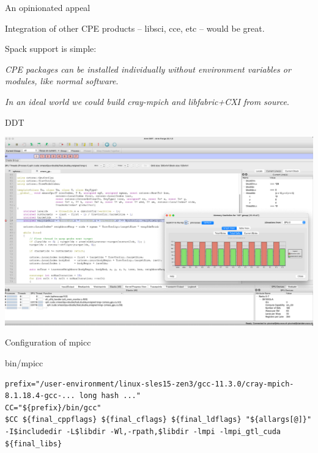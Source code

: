\documentclass[aspectratio=43]{beamer}
\begin{document}

\begin{frame}[fragile]{An opinionated appeal}
    \begin{center}
    Integration of other CPE products -- libsci, cce, etc -- would be great.

    \vspace{20pt}

    Spack support is simple:

    \vspace{20pt}

    \emph{CPE packages can be installed individually without environment variables or modules, like normal software}.

    \vspace{20pt}

    \emph{In an ideal world we could build cray-mpich and libfabric+CXI from source}.
    \end{center}
\end{frame}



\begin{frame}[fragile]{DDT}
    \begin{center}
        \includegraphics[width=\textwidth]{images/sph-ddt-uenv.png}
    \end{center}
\end{frame}

\begin{frame}[fragile]{Configuration of mpicc}
\begin{code}{bin/mpicc}
    \begin{lstlisting}[style=talkbash]
prefix="/user-environment/linux-sles15-zen3/gcc-11.3.0/cray-mpich-8.1.18.4-gcc-... long hash ..."
CC="${prefix}/bin/gcc"
$CC ${final_cppflags} ${final_cflags} ${final_ldflags} "${allargs[@]}" -I$includedir -L$libdir -Wl,-rpath,$libdir -lmpi -lmpi_gtl_cuda ${final_libs} \end{lstlisting}
\end{code}

\end{frame}
\end{document}
